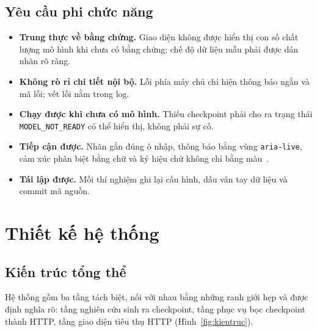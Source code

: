 \documentclass[12pt,a4paper]{report}
\newcommand{\code}[1]{\texttt{#1}}
\begin{document}
\section{Yêu cầu phi chức năng}

\begin{itemize}
  \item \textbf{Trung thực về bằng chứng.} Giao diện không được hiển thị con số chất lượng mô hình khi chưa có bằng
        chứng; chế độ dữ liệu mẫu phải được dán nhãn rõ ràng.
  \item \textbf{Không rò rỉ chi tiết nội bộ.} Lỗi phía máy chủ chỉ hiện thông báo ngắn và mã lỗi; vết lỗi nằm trong log.
  \item \textbf{Chạy được khi chưa có mô hình.} Thiếu checkpoint phải cho ra trạng thái \code{MODEL\_NOT\_READY} có thể
        hiển thị, không phải sự cố.
  \item \textbf{Tiếp cận được.} Nhãn gắn đúng ô nhập, thông báo bằng vùng \code{aria-live}, cảm xúc phân biệt bằng chữ và
        ký hiệu chứ không chỉ bằng màu~\cite{wcag}.
  \item \textbf{Tái lập được.} Mỗi thí nghiệm ghi lại cấu hình, dấu vân tay dữ liệu và commit mã nguồn.
\end{itemize}

\chapter{Thiết kế hệ thống}
\label{chap:thietke}

\section{Kiến trúc tổng thể}

Hệ thống gồm ba tầng tách biệt, nối với nhau bằng những ranh giới hẹp và được định nghĩa rõ: tầng nghiên cứu sinh ra
checkpoint, tầng phục vụ bọc checkpoint thành HTTP, tầng giao diện tiêu thụ HTTP (Hình~\ref{fig:kientruc}).
\end{document}
